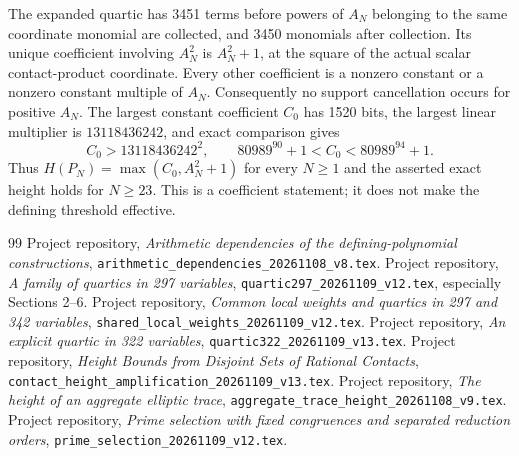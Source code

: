 \documentclass[11pt,a4paper]{article}
\begin{document}
The expanded quartic has 3451 terms before powers of $A_N$ belonging
to the same coordinate monomial are collected, and 3450 monomials
after collection. Its unique coefficient involving $A_N^2$ is
$A_N^2+1$, at the square of the actual scalar contact-product coordinate.
Every other coefficient is a nonzero constant or a nonzero constant
multiple of $A_N$. Consequently no support cancellation occurs for
positive $A_N$. The largest constant coefficient $C_0$ has 1520 bits,
the largest linear multiplier is $13118436242$, and exact comparison
gives
\[
 C_0>13118436242^2,\qquad
 80989^{90}+1<C_0<80989^{94}+1.
\]
Thus $H(P_N)=\max(C_0,A_N^2+1)$ for every $N\ge1$ and the asserted
exact height holds for $N\ge23$. This is a coefficient statement;
it does not make the defining threshold effective.

\begin{thebibliography}{99}
 Project repository,
\emph{Arithmetic dependencies of the defining-polynomial constructions},
\nolinkurl{arithmetic_dependencies_20261108_v8.tex}.
 Project repository,
\emph{A family of quartics in 297 variables},
\nolinkurl{quartic297_20261109_v12.tex}, especially Sections 2--6.
 Project repository,
\emph{Common local weights and quartics in 297 and 342 variables},
\nolinkurl{shared_local_weights_20261109_v12.tex}.
 Project repository,
\emph{An explicit quartic in 322 variables},
\nolinkurl{quartic322_20261109_v13.tex}.
 Project repository,
\emph{Height Bounds from Disjoint Sets of Rational Contacts},
\nolinkurl{contact_height_amplification_20261109_v13.tex}.
 Project repository,
\emph{The height of an aggregate elliptic trace},
\nolinkurl{aggregate_trace_height_20261108_v9.tex}.
 Project repository,
\emph{Prime selection with fixed congruences and separated reduction orders},
\nolinkurl{prime_selection_20261109_v12.tex}.
\end{thebibliography}
\end{document}
